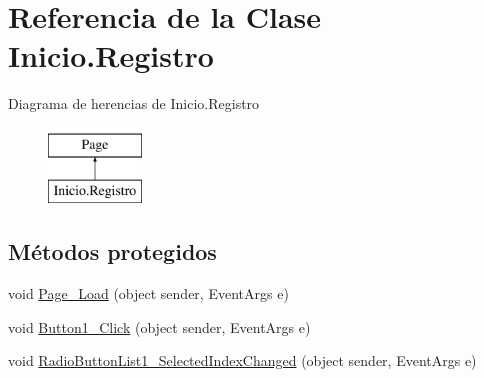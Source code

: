 \hypertarget{classInicio_1_1Registro}{}\section{Referencia de la Clase Inicio.\+Registro}
\label{classInicio_1_1Registro}
Diagrama de herencias de Inicio.\+Registro\begin{figure}[H]
\begin{center}
\leavevmode
\includegraphics[height=2.000000cm]{classInicio_1_1Registro}
\end{center}
\end{figure}
\subsection*{Métodos protegidos}
\begin{DoxyCompactItemize}
\item 
void \mbox{\hyperlink{classInicio_1_1Registro_a7208153fb65c746caeeadda5c34b96a7}{Page\+\_\+\+Load}} (object sender, Event\+Args e)
\item 
void \mbox{\hyperlink{classInicio_1_1Registro_a5fd08d11649d5319490065cdf317cdd0}{Button1\+\_\+\+Click}} (object sender, Event\+Args e)
\item 
void \mbox{\hyperlink{classInicio_1_1Registro_a3622e0de22647c232c2d664a90cb9798}{Radio\+Button\+List1\+\_\+\+Selected\+Index\+Changed}} (object sender, Event\+Args e)
\end{DoxyCompactItemize}
